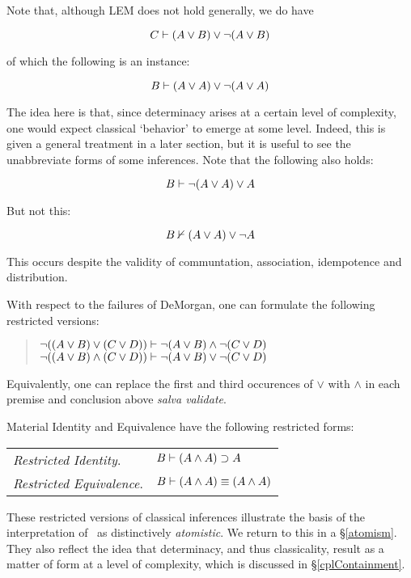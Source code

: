 Note that, although LEM does not hold generally, we do have

\[ {C}\vdash{(A\vee B)\vee\neg(A\vee B)} \]

\noindent of which the following is an instance:

\[ {B}\vdash{(A \vee A) \vee \neg(A \vee A)} \]

\noindent The idea here is that, since determinacy arises at a certain level of complexity, one would expect classical `behavior' to emerge at some level. Indeed, this is given a general treatment in a later section, but it is useful to see the unabbreviate forms of some inferences. Note that the following also holds:

\[ {B}\vdash{\neg(A \vee A) \vee A} \]

\noindent But not this:

\[ {B}\nvdash{(A \vee A) \vee \neg A} \]

\noindent This occurs despite the validity of communtation, association, idempotence and distribution.

With respect to the failures of DeMorgan, one can formulate the following restricted versions:

\begin{quote}
	$ {\neg((A\vee B) \vee (C\vee D))}\vdash{\neg(A\vee B)\wedge\neg(C\vee D)} $\\
	$ {\neg((A\vee B) \wedge (C\vee D))}\vdash{\neg(A\vee B)\vee\neg(C\vee D)} $
\end{quote}

\noindent Equivalently, one can replace the first and third occurences of $\vee$ with $\wedge$ in each premise and conclusion above \emph{salva validate}.

Material Identity and Equivalence have the following restricted forms:

\bigskip

\begin{tabular}{l l}
 \emph{Restricted Identity}.  & 	${B}\vdash{(A\wedge A)\supset A}$ \\
 \emph{Restricted Equivalence}. & 	${B}\vdash{(A \wedge A)\equiv (A \wedge A)}$ 
\end{tabular}

\bigskip

\noindent These restricted versions of classical inferences illustrate the basis of the interpretation of \GO\ as distinctively \emph{atomistic}. We return to this in a \S\ref{atomism}. They also reflect the idea that determinacy, and thus classicality, result as a matter of form at a level of complexity, which is discussed in \S\ref{cplContainment}.

